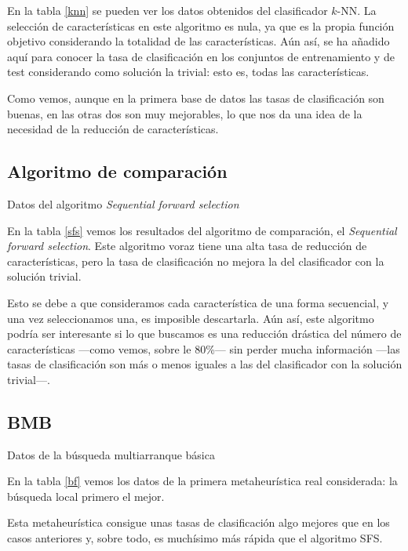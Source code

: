 \documentclass[a4paper, 11pt, titlepage]{article}
\begin{document}
    En la tabla \ref{knn} se pueden ver los datos obtenidos del clasificador $k$-NN. La selección de características en este algoritmo es nula, ya que es la propia función objetivo considerando la totalidad de las características. Aún así, se ha añadido aquí para conocer la tasa de clasificación en los conjuntos de entrenamiento y de test considerando como solución la trivial: esto es, todas las características.

    Como vemos, aunque en la primera base de datos las tasas de clasificación son buenas, en las otras dos son muy mejorables, lo que nos da una idea de la necesidad de la reducción de características.

    \subsection{Algoritmo de comparación}
    \begin{table}[!htb]
        \maketable{\dataSFS}
        \caption{Datos del algoritmo \emph{Sequential forward selection}}
        \label{sfs}
    \end{table}

    En la tabla \ref{sfs} vemos los resultados del algoritmo de comparación, el \emph{Sequential forward selection}. Este algoritmo voraz tiene una alta tasa de reducción de características, pero la tasa de clasificación no mejora la del clasificador con la solución trivial.

    Esto se debe a que consideramos cada característica de una forma secuencial, y una vez seleccionamos una, es imposible descartarla. Aún así, este algoritmo podría ser interesante si lo que buscamos es una reducción drástica del número de características ---como vemos, sobre le 80\%--- sin perder mucha información ---las tasas de clasificación son más o menos iguales a las del clasificador con la solución trivial---.

    \subsection{BMB}
    \begin{table}[!htb]
        \maketable{\dataBMB}
        \caption{Datos de la búsqueda multiarranque básica}
        \label{bf}
    \end{table}

    En la tabla \ref{bf} vemos los datos de la primera metaheurística real considerada: la búsqueda local primero el mejor.

    Esta metaheurística consigue unas tasas de clasificación algo mejores que en los casos anteriores y, sobre todo, es muchísimo más rápida que el algoritmo SFS.
\end{document}
